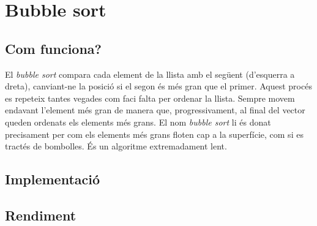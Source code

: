 \chapter{Bubble sort}

\section{Com funciona?}
El \textit{bubble sort} compara cada element de la llista amb el següent (d'esquerra a dreta), canviant-ne la posició si el segon és més gran que el primer.
Aquest procés es repeteix tantes vegades com faci falta per ordenar la llista.
Sempre movem endavant l'element més gran de manera que, progressivament, al final del vector queden ordenats els elements més grans.
El nom \textit{bubble sort} li és donat precisament per com els elements més grans floten cap a la superfície, com si es tractés de bombolles.
És un algoritme extremadament lent.

\section{Implementació}

\vspace{1em}

\begin{minipage}{\textwidth}
	\section{Rendiment}
	\noindent
	\makebox[\textwidth][c]{
		
		}
	\vspace*{1em}
	\begin{center}
		\resizebox{\textwidth}{!}{}
	\end{center}
\end{minipage}